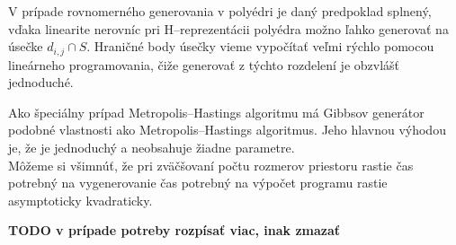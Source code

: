 V prípade rovnomerného generovania v polyédri je daný predpoklad splnený, vďaka linearite nerovníc pri H--reprezentácii polyédra možno ľahko generovať na úsečke $d_{i,j} \cap S$. Hraničné body úsečky vieme vypočítať veľmi rýchlo pomocou lineárneho programovania, čiže generovať z týchto rozdelení je obzvlášť jednoduché.

Ako špeciálny prípad Metropolis--Hastings algoritmu má Gibbsov generátor podobné vlastnosti ako Metropolis--Hastings algoritmus. Jeho hlavnou výhodou je, že je jednoduchý a neobsahuje žiadne parametre.\\

Môžeme si všimnúť, že pri zväčšovaní počtu rozmerov priestoru rastie čas potrebný na vygenerovanie čas potrebný na výpočet programu rastie asymptoticky kvadraticky.

\textbf{TODO v prípade potreby rozpísať viac, inak zmazať}
